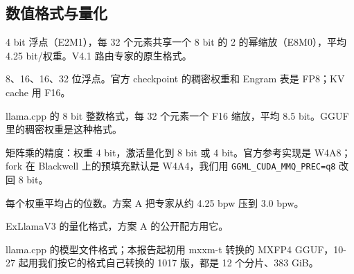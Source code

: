 \documentclass[11pt,a4paper]{article}
\newcommand{\code}[1]{\texttt{#1}}
\begin{document}
\subsection*{数值格式与量化}
\begin{description}\small
  \item[MXFP4] 4 bit 浮点（E2M1），每 32 个元素共享一个 8 bit 的 2 的幂缩放（E8M0），平均 4.25 bit/权重。V4.1 路由专家的原生格式。
  \item[FP8、BF16、F16、F32] 8、16、16、32 位浮点。官方 checkpoint 的稠密权重和 Engram 表是 FP8；KV cache 用 F16。
  \item[Q8\_0] llama.cpp 的 8 bit 整数格式，每 32 个元素一个 F16 缩放，平均 8.5 bit。GGUF 里的稠密权重是这种格式。
  \item[W4A8、W4A4] 矩阵乘的精度：权重 4 bit，激活量化到 8 bit 或 4 bit。官方参考实现是 W4A8；fork 在 Blackwell 上的预填充默认是 W4A4，我们用 \code{GGML\_CUDA\_MMQ\_PREC=q8} 改回 8 bit。
  \item[bpw] 每个权重平均占的位数。方案 A 把专家从约 4.25 bpw 压到 3.0 bpw。
  \item[EXL3] ExLlamaV3 的量化格式，方案 A 的公开配方用它。
  \item[GGUF] llama.cpp 的模型文件格式；本报告起初用 mxxm-t 转换的 MXFP4 GGUF，10-27 起用我们按它的格式自己转换的 1017 版，都是 12 个分片、383 GiB。
\end{description}
\end{document}
